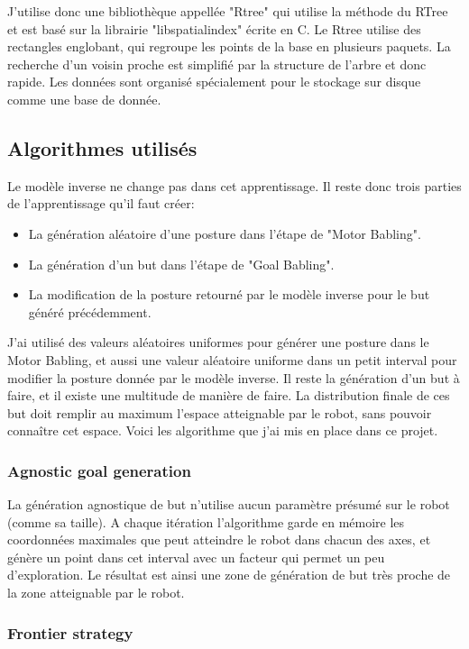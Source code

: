 \documentclass[11pt,french]{article}
\begin{document}
J'utilise donc une bibliothèque appellée "Rtree" qui utilise la méthode du RTree et est basé sur la librairie "libspatialindex" écrite en C. Le Rtree utilise des rectangles englobant, qui regroupe les points de la base en plusieurs paquets. La recherche d'un voisin proche est simplifié par la structure de l'arbre et donc rapide. Les données sont organisé spécialement pour le stockage sur disque comme une base de donnée.

\subsection{Algorithmes utilisés}

Le modèle inverse ne change pas dans cet apprentissage. Il reste donc trois parties de l'apprentissage qu'il faut créer:
\begin{itemize}
    \item La génération aléatoire d'une posture dans l'étape de "Motor Babling".
    \item La génération d'un but dans l'étape de "Goal Babling".
    \item La modification de la posture retourné par le modèle inverse pour le but généré précédemment.
\end{itemize}

J'ai utilisé des valeurs aléatoires uniformes pour générer une posture dans le Motor Babling, et aussi une valeur aléatoire uniforme dans un petit interval pour modifier la posture donnée par le modèle inverse. Il reste la génération d'un but à faire, et il existe une multitude de manière de faire. La distribution finale de ces but doit remplir au maximum l'espace atteignable par le robot, sans pouvoir connaître cet espace. Voici les algorithme que j'ai mis en place dans ce projet.

\subsubsection{Agnostic goal generation}

La génération agnostique de but n'utilise aucun paramètre présumé sur le robot (comme sa taille). A chaque itération l'algorithme garde en mémoire les coordonnées maximales que peut atteindre le robot dans chacun des axes, et génère un point dans cet interval avec un facteur qui permet un peu d'exploration. Le résultat est ainsi une zone de génération de but très proche de la zone atteignable par le robot.

\subsubsection{Frontier strategy}
\end{document}
